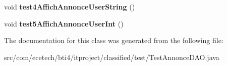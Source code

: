 \begin{DoxyCompactItemize}
\item 
void {\bfseries test4\+Affich\+Annonce\+User\+String} ()\hypertarget{classcom_1_1ecetech_1_1bti4_1_1itproject_1_1classified_1_1test_1_1_test_annonce_d_a_o_a9d806c52ae3ffd2253593ba8e1a62dfb}{}\label{classcom_1_1ecetech_1_1bti4_1_1itproject_1_1classified_1_1test_1_1_test_annonce_d_a_o_a9d806c52ae3ffd2253593ba8e1a62dfb}

\item 
void {\bfseries test5\+Affich\+Annonce\+User\+Int} ()\hypertarget{classcom_1_1ecetech_1_1bti4_1_1itproject_1_1classified_1_1test_1_1_test_annonce_d_a_o_aa7e8b08dd07cdb04fd9253edb2fdef67}{}\label{classcom_1_1ecetech_1_1bti4_1_1itproject_1_1classified_1_1test_1_1_test_annonce_d_a_o_aa7e8b08dd07cdb04fd9253edb2fdef67}

\end{DoxyCompactItemize}


The documentation for this class was generated from the following file\+:\begin{DoxyCompactItemize}
\item 
src/com/ecetech/bti4/itproject/classified/test/Test\+Annonce\+D\+A\+O.\+java\end{DoxyCompactItemize}
